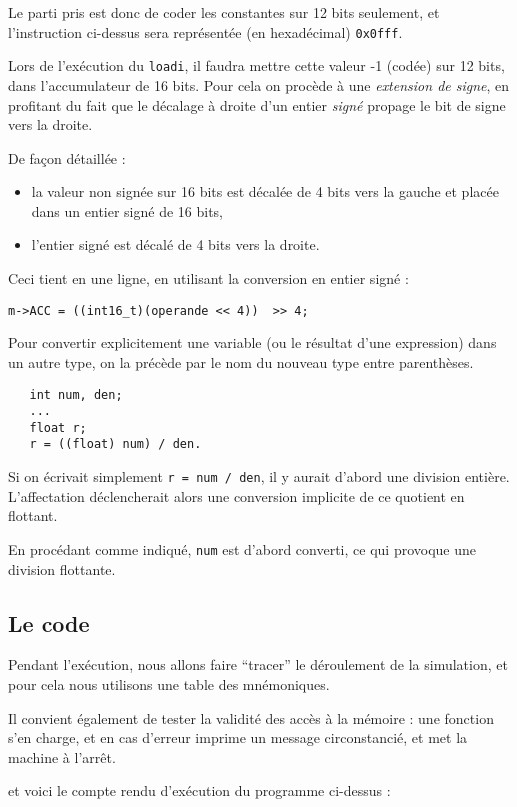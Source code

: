 \documentclass[10pt]{article}
\begin{document}
Le parti pris est donc de coder les constantes sur 12 bits seulement,
et l'instruction ci-dessus sera représentée (en hexadécimal) \texttt{0x0fff}.

Lors de l'exécution du \texttt{loadi}, il faudra mettre cette 
valeur -1 (codée) sur 12 bits, dans l'accumulateur de 16 bits.
Pour cela on procède à une \emph{extension de signe}, en profitant du fait
que le décalage à droite d'un entier \emph{signé} propage le bit de signe
vers la droite.

De façon détaillée :
\begin{itemize}
\item la valeur non signée sur 16 bits est décalée de 4 bits vers la
  gauche et placée dans un entier signé de 16 bits,
\item l'entier signé est décalé de 4 bits vers la droite. 
\end{itemize}

Ceci tient en une ligne, en utilisant la conversion en entier signé :
\begin{verbatim}
m->ACC = ((int16_t)(operande << 4))  >> 4; 
\end{verbatim}
Pour convertir explicitement une variable (ou le résultat d'une
expression) dans un autre type, on la précède par le nom du nouveau
type entre parenthèses.
\begin{verbatim}
   int num, den;
   ...
   float r;
   r = ((float) num) / den.
\end{verbatim}
Si on écrivait simplement \texttt{r = num / den}, il y aurait d'abord
une division entière. L'affectation déclencherait alors une conversion 
implicite de ce quotient en flottant.

En procédant comme indiqué, \texttt{num} est d'abord converti, ce qui provoque 
une division flottante.

\subsection{Le code}

Pendant l'exécution, nous allons faire ``tracer'' le déroulement de la
simulation, et pour cela nous utilisons une table des mnémoniques.

Il convient également de tester la validité des accès à la mémoire :
une fonction s'en charge, et en cas d'erreur imprime un message circonstancié,
et met la machine à l'arrêt.



et voici le compte rendu d'exécution du programme ci-dessus :

{\small

}
\end{document}
